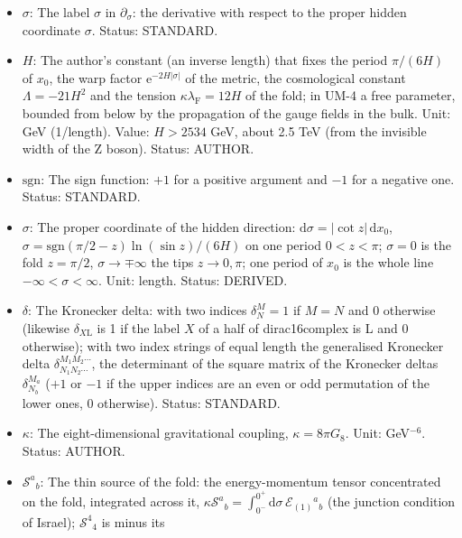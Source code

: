 \documentclass[
  10pt,
]{article}
\begin{document}
\begin{itemize}
  respect to \(\sigma\); \(\partial_M\) and \(\partial_\mu\) with
  respect to the coordinate that carries the same index, of the eight
  dimensions or of the fold). Status: STANDARD.
\item
  \(\sigma\): The label \(\sigma\) in \(\partial_\sigma\): the
  derivative with respect to the proper hidden coordinate \(\sigma\).
  Status: STANDARD.
\item
  \(H\): The author's constant (an inverse length) that fixes the period
  \(\pi/(6H)\) of \(x_0\), the warp factor
  \(\mathrm{e}^{-2H\lvert\sigma\rvert}\) of the metric, the cosmological
  constant \(\Lambda = -21H^2\) and the tension
  \(\kappa\lambda_{\mathrm{F}} = 12H\) of the fold; in UM-4 a free
  parameter, bounded from below by the propagation of the gauge fields
  in the bulk. Unit: GeV (1/length). Value: \(H > 2534\) GeV, about 2.5
  TeV (from the invisible width of the Z boson). Status: AUTHOR.
\item
  \(\mathrm{sgn}\): The sign function: \(+1\) for a positive argument
  and \(-1\) for a negative one. Status: STANDARD.
\item
  \(\sigma\): The proper coordinate of the hidden direction:
  \(\mathrm{d}\sigma = \lvert\cot z\rvert\,\mathrm{d}x_0\),
  \(\sigma = \mathrm{sgn}(\pi/2 - z)\ln(\sin z)/(6H)\) on one period
  \(0 < z < \pi\); \(\sigma = 0\) is the fold \(z = \pi/2\),
  \(\sigma \to \mp\infty\) the tips \(z \to 0, \pi\); one period of
  \(x_0\) is the whole line \(-\infty < \sigma < \infty\). Unit: length.
  Status: DERIVED.
\item
  \(\delta\): The Kronecker delta: with two indices \(\delta^M_N = 1\)
  if \(M = N\) and 0 otherwise (likewise \(\delta_{X\mathrm{L}}\) is 1
  if the label \(X\) of a half of dirac16complex is L and 0 otherwise);
  with two index strings of equal length the generalised Kronecker delta
  \(\delta^{M_1M_2\cdots}_{N_1N_2\cdots}\), the determinant of the
  square matrix of the Kronecker deltas \(\delta^{M_a}_{N_b}\) (\(+1\)
  or \(-1\) if the upper indices are an even or odd permutation of the
  lower ones, 0 otherwise). Status: STANDARD.
\item
  \(\kappa\): The eight-dimensional gravitational coupling,
  \(\kappa = 8\pi G_8\). Unit: GeV\(^{-6}\). Status: AUTHOR.
\item
  \(\mathcal{S}^a{}_b\): The thin source of the fold: the
  energy-momentum tensor concentrated on the fold, integrated across it,
  \(\kappa\mathcal{S}^a{}_b = \int_{0^-}^{0^+}\mathrm{d}\sigma\,\mathcal{E}_{(1)}{}^a{}_b\)
  (the junction condition of Israel); \(\mathcal{S}^4{}_4\) is minus its

\end{itemize}
\end{document}
